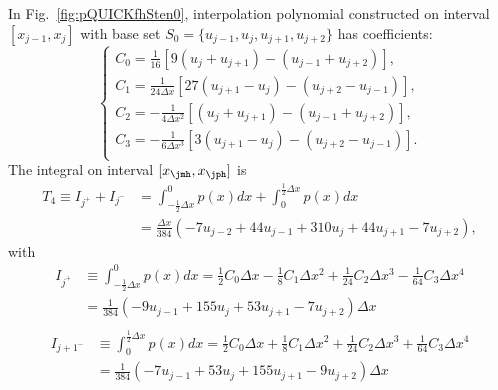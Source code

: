\documentclass[]{article}
\newcommand{\diff}{d}
\begin{document}
In Fig.~\ref{fig:pQUICKfhSten0}, interpolation polynomial constructed on
interval $[x_{j-1}, x_j]$ with base set $S_0 = \{u_{j-1}, u_j, u_{j+1},
u_{j+2}\}$ has coefficients:
\[
    \left\{\begin{array}{ll}
	\displaystyle
	C_0=\frac{1}{16}\left[9(u_j+u_{j+1})-(u_{j-1}+u_{j+2})\right],\\[3mm]
	\displaystyle
	C_1 = \frac{1}{24\Delta x}\left[27(u_{j+1}-u_j)-(u_{j+2}-u_{j-1})\right],\\[3mm]
	\displaystyle
	C_2 = -\frac{1}{4\Delta x^2}\left[(u_{j}+u_{j+1})-(u_{j-1}+u_{j+2})\right],\\[3mm]
	\displaystyle
	C_3 = -\frac{1}{6\Delta x^3}\left[3(u_{j+1}-u_j)-(u_{j+2}-u_{j-1})\right].\\
    \end{array}\right.
\]
The integral on interval $[x_\jmh, x_\jph]$ is
\begin{align*}
    T_4\equiv I_{j^+} + I_{j^-} &= \int_{-\frac12\Delta x}^0 p(x) \diff x + 
    \int_0^{\frac12\Delta x} p(x) \diff x \\
    &= \frac{\Delta x}{384}(-7 u_{j-2}+44u_{j-1}+310 u_j+44 u_{j+1}-7 u_{j+2}),
\end{align*}
with
\[
\begin{array}{ll}
I_{j^+} &\displaystyle \equiv\int_{-\frac{1}{2}\Delta x}^0 p(x)dx = \frac{1}{2}C_0\Delta x-\frac{1}{8}C_1\Delta x^2+\frac{1}{24}C_2\Delta x^3-\frac{1}{64}C_3\Delta x^4 \\[4mm]
&\displaystyle
= \frac{1}{384}(-9 u_{j-1}+155u_j+53u_{j+1}-7u_{j+2})\Delta x\\
\end{array}
\]
\[
\begin{array}{ll}
I_{j+1^-} &\displaystyle \equiv\int_0^{\frac{1}{2}\Delta x} p(x)dx = \frac{1}{2}C_0\Delta x+\frac{1}{8}C_1\Delta x^2+\frac{1}{24}C_2\Delta x^3+\frac{1}{64}C_3\Delta x^4 \\[4mm]
&\displaystyle
= \frac{1}{384}(-7 u_{j-1}+53u_j+155u_{j+1}-9u_{j+2})\Delta x\\
\end{array}
\]
\end{document}
